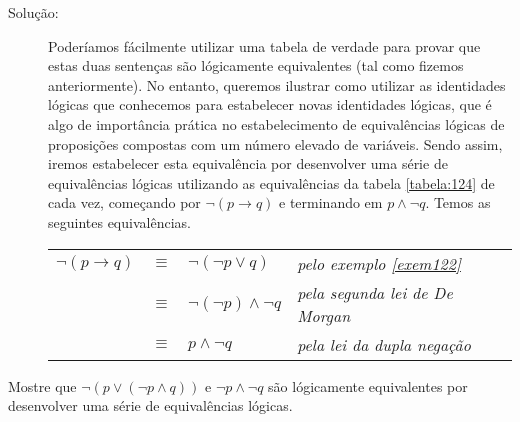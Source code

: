 \begin{description}
\item[Solução:] Poderíamos fácilmente utilizar uma tabela de verdade para provar
que estas duas sentenças são lógicamente equivalentes (tal como fizemos
anteriormente). No entanto, queremos ilustrar como utilizar as identidades
lógicas que conhecemos para estabelecer novas identidades lógicas, que é algo de
importância prática no estabelecimento de equivalências lógicas de proposições
compostas com um número elevado de variáveis. Sendo assim, iremos estabelecer
esta equivalência por desenvolver uma série de equivalências lógicas utilizando
as equivalências da tabela \ref{tabela:124} de cada vez, começando por $\lnot
(p \to q)$ e terminando em $p \land \lnot q$. Temos as seguintes equivalências.

 \begin{table}[H]
	\centering
	\begin{tabular}{rcll}%
	$\lnot (p \to q)$ & $\equiv$ & $\lnot (\lnot p \lor q)$ & \emph{pelo exemplo
	\ref{exem122}}\\
	 & $\equiv$ & $\lnot (\lnot p) \land \lnot q$ & \emph{pela segunda lei
	 de De Morgan}\\	
	& $\equiv$ & $p \land \lnot q$ & \emph{pela lei da dupla negação}\\	
	\end{tabular}%
\end{table}
\end{description}


\begin{exmp}
\label{exem126}
Mostre que $\lnot (p \lor (\lnot p \land q))$ e $\lnot p \land \lnot q$ são
lógicamente equivalentes por desenvolver uma série de equivalências lógicas.
\end{exmp}

